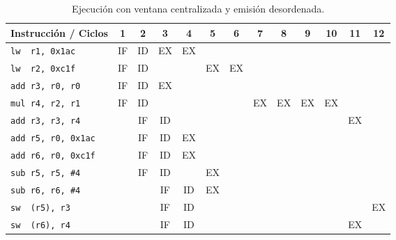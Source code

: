 \begin{ejercicio}
\begin{table}[H]
\centering
\scriptsize
\begin{tabular}{|l|c|c|c|c|c|c|c|c|c|c|c|c|}
    \hline
    Instrucción / Ciclos & 1 & 2 & 3 & 4 & 5 & 6 & 7 & 8 & 9 & 10 & 11 & 12  \\
    \hline
    \verb|lw  r1, 0x1ac|     & IF & ID & EX & EX & & & & & & & & \\
    \hline        
    \verb|lw  r2, 0xc1f|     & IF & ID & & & EX & EX & & & & & & \\
    \hline           
    \verb|add r3, r0, r0|    & IF & ID & EX & & & & & & & & & \\
    \hline                        
    \verb|mul r4, r2, r1|    & IF & ID & & & & & EX & EX & EX & EX & & \\
    \hline            
    \verb|add r3, r3, r4|    & & IF & ID & & & & & & & & EX & \\
    \hline
    \verb|add r5, r0, 0x1ac| & & IF & ID & EX & & & & & & & & \\
    \hline
    \verb|add r6, r0, 0xc1f| & & IF & ID & EX & & & & & & & & \\
    \hline
    \verb|sub r5, r5, #4|    & & IF & ID & & EX & & & & & & & \\
    \hline            
    \verb|sub r6, r6, #4|    & & & IF & ID & EX & & & & & & & \\
    \hline
    \verb|sw  (r5), r3|      & & & IF & ID & & & & & & &  & EX \\
    \hline
    \verb|sw  (r6), r4|      & & & IF & ID & & & & & & & EX &  \\
    \hline
\end{tabular}
\caption{Ejecución con ventana centralizada y emisión desordenada.}
\end{table}


\end{ejercicio}
